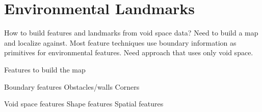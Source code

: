 



\pagebreak 

\chapter{Environmental Landmarks}
\label{environmentallandmarks}

How to build features and landmarks from void space data? Need to build a map and localize against. Most feature techniques use boundary information as primitives for environmental features. Need approach that uses only void space.

Features to build the map

Boundary features
Obstacles\slash walls
Corners

Void space features
Shape features
Spatial features

